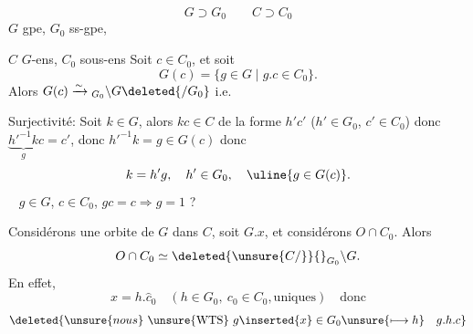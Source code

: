 \[G\supset G_0\qquad C\supset C_0\]
$G$ gpe, $G_0$ ss-gpe, 

$C$ $G$-ens, $C_0$ sous-ens
Soit $c\in C_0$, et soit
\[G(c)=\{g\in G\mid g.c\in C_0\}.\]
Alors $G(c)\xrightarrow{\sim}{}_{G_0}\backslash G\deleted{/G_0}$ i.e.

Surjectivité: Soit $k\in G$, alors $kc\in C$ de la forme $h'c'$
($h'\in G_0$, $c'\in C_0$) donc $\underbrace{h'^{-1}k}_{g}c=c'$,
donc $h'^{-1}k=g\in G(c)$ donc
\[k=h'g,\quad h'\in G_0,\quad\uline{g\in G(c)}.\]
\  $g\in G$, $c\in C_0$, $gc=c\Longrightarrow g=1$ ?


Considérons une orbite de $G$ dans $C$, soit $G.x$, et considérons $O\cap C_0$. Alors
\[O\cap C_0\simeq\deleted{\unsure{C/}}{}_{G_0}\backslash G.\]
En effet, 
\[x=h.\hat c_0\quad(h\in G_0,\ c_0\in C_0,\text{uniques})\quad\text{donc}\]
\[\deleted{\unsure{nous}\ \unsure{\mathrm{WTS}}\ g\inserted{x}\in G_0\unsure{\longmapsto h}\quad g.h.c}\]

